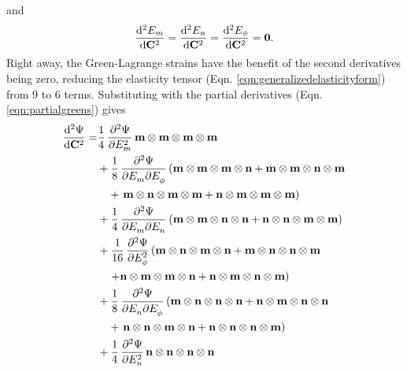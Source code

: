 and 
\begin{equation}
\dod[2]{E_m}{\mathbf{C}} = \dod[2]{E_n}{\mathbf{C}} = \dod[2]{E_\phi}{\mathbf{C}} = \mathbf{0}.
\end{equation}
Right away, the Green-Lagrange strains have the benefit of the second derivatives being zero, reducing the elasticity tensor (Eqn. \ref{eqn:generalizedelasticityform}) from 9 to 6 terms. Substituting with the partial derivatives (Eqn. \ref{eqn:partialgreens}) gives
\begin{equation}\label{eqn:greenelasticityform}
\begin{aligned}
\dod[2]{\Psi}{\mathbf{C}} =
	& \frac{1}{4}\dpd[2]{\Psi}{E_m} \mathbf{m}\otimes\mathbf{m}\otimes\mathbf{m}\otimes\mathbf{m}	\\
    &+ \frac{1}{8}\dmd{\Psi}{2}{E_m}{}{E_\phi}{} 
    	\left(
        	\mathbf{m}\otimes\mathbf{m}\otimes\mathbf{m}\otimes\mathbf{n}
            +\mathbf{m}\otimes\mathbf{m}\otimes\mathbf{n}\otimes\mathbf{m} \right.\\
            &\quad +\left.\mathbf{m}\otimes\mathbf{n}\otimes\mathbf{m}\otimes\mathbf{m}
            +\mathbf{n}\otimes\mathbf{m}\otimes\mathbf{m}\otimes\mathbf{m}
        \right)	\\
    &+ \frac{1}{4}\dmd{\Psi}{2}{E_m}{}{E_n}{} 
    	\left(
        	\mathbf{m}\otimes\mathbf{m}\otimes\mathbf{n}\otimes\mathbf{n}
            +\mathbf{n}\otimes\mathbf{n}\otimes\mathbf{m}\otimes\mathbf{m}
        \right)	\\
    &+ \frac{1}{16}\dpd[2]{\Psi}{E_\phi} 
    	\left(
        	\mathbf{m}\otimes\mathbf{n}\otimes\mathbf{m}\otimes\mathbf{n}
            +\mathbf{m}\otimes\mathbf{n}\otimes\mathbf{n}\otimes\mathbf{m} \right. \\
            &\quad \left.+\mathbf{n}\otimes\mathbf{m}\otimes\mathbf{m}\otimes\mathbf{n}
            +\mathbf{n}\otimes\mathbf{m}\otimes\mathbf{n}\otimes\mathbf{m}
        \right)	\\
    &+ \frac{1}{8}\dmd{\Psi}{2}{E_n}{}{E_\phi}{} 
    	\left(
        	\mathbf{m}\otimes\mathbf{n}\otimes\mathbf{n}\otimes\mathbf{n}
            +\mathbf{n}\otimes\mathbf{m}\otimes\mathbf{n}\otimes\mathbf{n} \right. \\
            &\quad +\left. \mathbf{n}\otimes\mathbf{n}\otimes\mathbf{m}\otimes\mathbf{n}
            +\mathbf{n}\otimes\mathbf{n}\otimes\mathbf{n}\otimes\mathbf{m}
        \right)	\\
    &+ \frac{1}{4} \dpd[2]{\Psi}{E_n} \mathbf{n}\otimes\mathbf{n}\otimes\mathbf{n}\otimes\mathbf{n}	\\
\end{aligned}
\end{equation}


